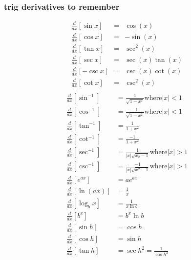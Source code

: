 \documentclass[a4paper, 12p]{report}
\begin{document}
\subsubsection{trig derivatives to remember}
\begin{eqnarray*}
    \frac{d}{dx}[\sin x]&=&\cos (x)\\
    \frac{d}{dx}[\cos x]&=&-\sin(x)\\
    \frac{d}{dx}[\tan x]&=&\sec^2 (x)\\
    \frac{d}{dx}[\sec x]&=&\sec(x)\tan(x)\\
    \frac{d}{dx}[-\csc x]&=&\csc(x)\cot(x)\\
    \frac{d}{dx}[\cot x]&=&\csc^2(x)\\
\end{eqnarray*}
\begin{align*}
    \frac{d}{dx}\left[\sin^{-1}\right]&= \frac{1}{\sqrt{1-x^2}} \text{where} |x|<1\\
    \frac{d}{dx}\left[\cos^{-1}\right]&= \frac{-1}{\sqrt{1-x^2}} \text{where} |x|<1 \\
    \frac{d}{dx}\left[\tan^{-1}\right]&=\frac{1}{1+x^2}  \\
    \frac{d}{dx}\left[\cot^{-1}\right]&= \frac{-1}{1+x^2} \\
    \frac{d}{dx}\left[\sec^{-1}\right]&=\frac{1}{|x|\sqrt{x_2-1}} \text{where} |x|>1\\
    \frac{d}{dx}\left[\csc^{-1}\right]&= \frac{-1}{|x|\sqrt{x^2-1}} \text{where} |x|>1 \\
    \frac{d}{dx}\left[e^{ax}\right]&= ae^{ax} \\
    \frac{d}{dx}\left[\ln(ax)\right]&= \frac{1}{x} \\
    \frac{d}{dx}\left[\log_bx\right]&= \frac{1}{x \ln b} \\
    \frac{d}{dx}\left[b^x\right]&= b^x \ln b \\
    \frac{d}{dx}\left[\sin h\right]&= \cos h \\
    \frac{d}{dx}\left[\cos h\right]&= \sin h \\
    \frac{d}{dx}\left[\tan h\right]&= \sec h^2= \frac{1}{\cos h^{2}}
\end{align*}

\end{document}
